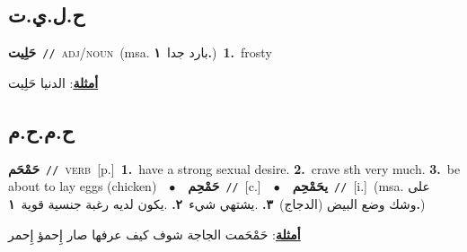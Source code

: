 \documentclass[10pt,a4paper,twoside]{article} %
\begin{document}
\begin{multicols}{2}
\vspace{-3mm}
\subsection*{\color{blue}\foreignlanguage{arabic}{ح.ل.ي.ت}\color{blue}{ (ntws)}} 

{\setlength\topsep{0pt}\textbf{\foreignlanguage{arabic}{حَلِيت}}\ {\color{gray}\texttt{//}\color{black}}\ \textsc{adj/noun}\ \color{gray}(msa. \foreignlanguage{arabic}{بارد جدا}~\foreignlanguage{arabic}{\textbf{١.}})\color{black}\ \textbf{1.}~frosty\  \begin{flushright}\color{gray}\foreignlanguage{arabic}{\textbf{\underline{\foreignlanguage{arabic}{أمثلة}}}: الدنيا حَلِيت}\end{flushright}\color{black}} \vspace{2mm}

\vspace{-3mm}
\subsection*{\color{blue}\foreignlanguage{arabic}{ح.م.ح.م}\color{blue}{}} 

{\setlength\topsep{0pt}\textbf{\foreignlanguage{arabic}{حَمْحَم}}\ {\color{gray}\texttt{//}\color{black}}\ \textsc{verb}\ [p.]\ \textbf{1.}~have a strong sexual desire.  \textbf{2.}~crave sth very much.  \textbf{3.}~be about to lay eggs (chicken)\ \ $\bullet$\ \ \setlength\topsep{0pt}\textbf{\foreignlanguage{arabic}{حَمْحِم}}\ {\color{gray}\texttt{//}\color{black}}\ [c.]\ \ $\bullet$\ \ \setlength\topsep{0pt}\textbf{\foreignlanguage{arabic}{يحَمْحِم}}\ {\color{gray}\texttt{//}\color{black}}\ [i.]\ \color{gray}(msa. \foreignlanguage{arabic}{على وشك وضع البيض (الدجاج)}~\foreignlanguage{arabic}{\textbf{٣.}}  .\foreignlanguage{arabic}{يشتهي شيء}~\foreignlanguage{arabic}{\textbf{٢.}}  .\foreignlanguage{arabic}{يكون لديه رغبة جنسية قوية}~\foreignlanguage{arabic}{\textbf{١.}})\color{black}\  \begin{flushright}\color{gray}\foreignlanguage{arabic}{\textbf{\underline{\foreignlanguage{arabic}{أمثلة}}}: حَمْحَمت الجاجة شوف كيف عرفها صار إِحمؤ إِحمر}\end{flushright}\color{black}} \vspace{2mm}


\end{multicols}
\end{document}
